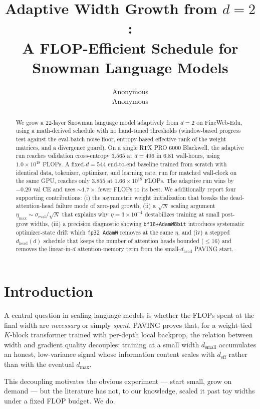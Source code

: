 \documentclass{article}
\title{Adaptive Width Growth from $d=2$:\\
A FLOP-Efficient Schedule for Snowman Language Models}
\author{\name{} Anonymous \\ \addr{} Anonymous}
\newcommand{\deff}{d_{\mathrm{eff}}}
\begin{document}
\maketitle

\begin{abstract}
We grow a 22-layer Snowman language model adaptively from $d{=}2$ on
FineWeb-Edu, using a math-derived schedule with no hand-tuned
thresholds (window-based progress test against the eval-batch noise
floor, entropy-based effective rank of the weight matrices, and a
divergence guard).  On a single RTX PRO 6000 Blackwell, the adaptive
run reaches validation cross-entropy $3.565$ at $d{=}496$ in $6.81$
wall-hours, using $1.0{\times}10^{18}$ FLOPs.  A fixed-$d{=}544$
end-to-end baseline trained from scratch with identical data,
tokenizer, optimizer, and learning rate, run for matched wall-clock
on the same GPU, reaches only $3.855$ at $1.66{\times}10^{18}$ FLOPs.
The adaptive run wins by $-0.29$ val CE and uses $\sim 1.7{\times}$
fewer FLOPs to its best.  We additionally report four supporting
contributions: (i) the asymmetric weight initialization that breaks
the dead-attention-head failure mode of zero-pad growth, (ii) a
$\sqrt{N}$ scaling argument $\eta_{\max} \sim \sigma_{\text{eval}} /
\sqrt{N}$ that explains why $\eta = 3{\times}10^{-4}$ destabilizes
training at small post-grow widths, (iii) a precision diagnostic
showing \texttt{bf16+AdamW8bit} introduces systematic optimizer-state
drift which \texttt{fp32 AdamW} removes at the same $\eta$, and (iv)
a stepped $d_{\text{head}}(d)$ schedule that keeps the number of
attention heads bounded ($\le 16$) and removes the linear-in-$d$
attention-memory term from the small-$d_{\text{head}}$ PAVING start.
\end{abstract}

\section{Introduction}

A central question in scaling language models is whether the FLOPs spent at
the final width are \emph{necessary} or simply \emph{spent}.  PAVING
\citep{paving} proves that, for a weight-tied $K$-block transformer trained
with per-depth local backprop, the relation between width and gradient
quality decouples: training at a small width $d_{\text{small}}$ accumulates
an honest, low-variance signal whose information content scales with
$\deff$ rather than with the eventual $d_{\max}$.

This decoupling motivates the obvious experiment --- start small, grow on
demand --- but the literature has not, to our knowledge, scaled it past toy
widths under a fixed FLOP budget.  We do.
\end{document}
